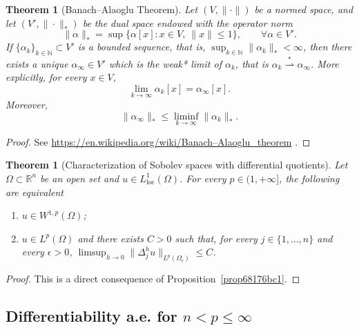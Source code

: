 \documentclass[a4paper,9pt]{amsart}
\newcommand{\N}{\mathbb{N}}	%
\newcommand{\R}{\mathbb{R}}	%
\newcommand{\loc}{\mathrm{loc}}
\theoremstyle{plain}
\newtheorem{theorem}[proposition]{Theorem}
\theoremstyle{definition}
\theoremstyle{remark}
\begin{document}
\newcommand{\weakstarto}{\overset{*}{\rightharpoonup}}
\begin{theorem}[Banach–Alaoglu Theorem]\label{thm68173edd}
	Let $(V,\|\cdot\|)$ be a normed space, and let $(V',\|\cdot\|_*)$ be the dual space endowed with the operator norm
	\begin{equation}
		\|\alpha\|_* = \sup\{\alpha[x]:x\in V,\ \|x\|\le 1\} ,
		\qquad\forall\alpha\in V' .
	\end{equation}
	If $\{\alpha_k\}_{k\in\N}\subset V'$ is a bounded sequence, 
	that is, $\sup_{k\in\N} \|\alpha_k\|_* < \infty$, 
	then there exists a unique $\alpha_\infty\in V'$ which is the weak* limit of $\alpha_k$, that is $\alpha_k\weakstarto\alpha_\infty$.
	More explicitly, for every $x\in V$,
	\begin{equation}
		\lim_{k\to\infty} \alpha_k[x] = \alpha_\infty[x] .
	\end{equation}
	Moreover, 
	\begin{equation}\label{eq6817438c}
		\|\alpha_\infty\|_* \le \liminf_{k\to\infty} \|\alpha_k\|_* .
	\end{equation}
\end{theorem}
\begin{proof}
	See \url{https://en.wikipedia.org/wiki/Banach–Alaoglu_theorem} .
\end{proof}

\begin{theorem}[Characterization of Sobolev spaces with differential quotients]\label{thm681736aa}
	Let $\Omega\subset\R^n$ be an open set and $u\in L^1_\loc(\Omega)$.
	For every $p\in(1,+\infty]$, 
	the following are equivalent
	\begin{enumerate}[label=(\roman*)]
	\item\label{thm681736aa_1}
	$u\in W^{1,p}(\Omega)$;
	\item\label{thm681736aa_2}
	$u\in L^p(\Omega)$ and there exists $C>0$ such that, for every $j\in\{1,\dots,n\}$ and every $\epsilon>0$, 
	$\limsup_{h\to0} \|\Delta_j^h u \|_{L^p(\Omega_\epsilon)} \le C$.
	\end{enumerate}
\end{theorem}
\begin{proof}
	This is a direct consequence of Proposition~\ref{prop68176bc1}.
\end{proof}

\subsection{Differentiability a.e. for $n<p\le\infty$}
\end{document}
